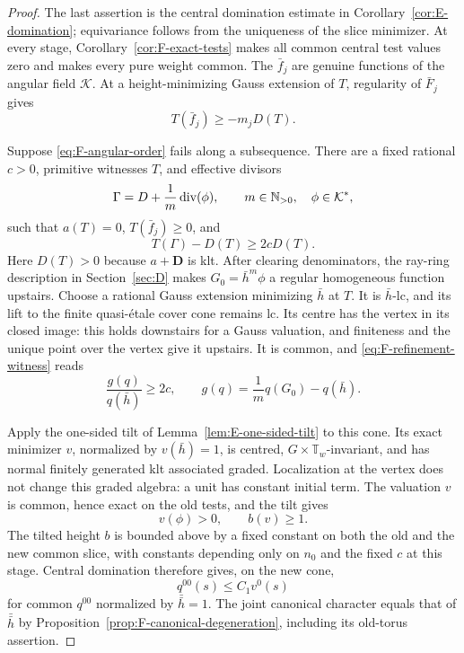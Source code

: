 \begin{proof}
The last assertion is the central domination estimate in
Corollary~\ref{cor:E-domination}; equivariance follows from the
uniqueness of the slice minimizer.  At every stage,
Corollary~\ref{cor:F-exact-tests} makes all common central test
values zero and makes every pure weight common.  The $\bar f_j$
are genuine functions of the angular field $\mathcal K$.
At a height-minimizing Gauss extension of $T$, regularity of
$\bar F_j$ gives
\begin{equation}\label{eq:F-angular-test-cost}
 T(\bar f_j)\ge-m_jD(T).
\end{equation}

Suppose \eqref{eq:F-angular-order} fails along a subsequence.
There are a fixed rational $c>0$, primitive witnesses $T$, and
effective divisors
\[
 \Gamma=D+\frac1m\operatorname{div}(\phi),\qquad m\in\mathbb N_{>0},
 \quad\phi\in\mathcal K^*,
\]
such that $a(T)=0$, $T(\bar f_j)\ge0$, and
\begin{equation}\label{eq:F-refinement-witness}
 T(\Gamma)-D(T)\ge2cD(T).
\end{equation}
Here $D(T)>0$ because $a+\mathbf D$ is klt.
After clearing denominators, the ray-ring description in
Section~\ref{sec:D} makes
$G_0=\bar h^m\phi$ a regular homogeneous function upstairs.
Choose a rational Gauss extension minimizing $\bar h$ at $T$.
It is $\bar h$-lc, and its lift to the finite quasi-\'{e}tale
cover cone remains lc.  Its centre has the vertex in its closed
image: this holds downstairs for a Gauss valuation, and finiteness
and the unique point over the vertex give it upstairs.
It is common, and \eqref{eq:F-refinement-witness} reads
\[
 \frac{g(q)}{q(\bar h)}\ge2c,
 \qquad g(q)=\frac1m q(G_0)-q(\bar h).
\]

Apply the one-sided tilt of Lemma~\ref{lem:E-one-sided-tilt} to
this cone.  Its exact minimizer $v$, normalized by $v(\bar h)=1$,
is centred, $G\times\mathbb T_w$-invariant, and has normal
finitely generated klt associated graded.  Localization at the
vertex does not change this graded algebra: a unit has constant
initial term.  The valuation $v$ is common, hence exact on the
old tests, and the tilt gives
\[
 v(\phi)>0,\qquad b(v)\ge1.
\]
The tilted height $b$ is bounded above by a fixed constant on
both the old and the new common slice, with constants depending
only on $n_0$ and the fixed $c$ at this stage.
Central domination therefore gives, on the new cone,
\begin{equation}\label{eq:F-tilt-balance}
 q^{00}(s)\le C_1v^0(s)
\end{equation}
for common $q^{00}$ normalized by $\bar{\bar h}=1$.
The joint canonical character equals that of $\bar{\bar h}$ by
Proposition~\ref{prop:F-canonical-degeneration}, including its
old-torus assertion.


\end{proof}
